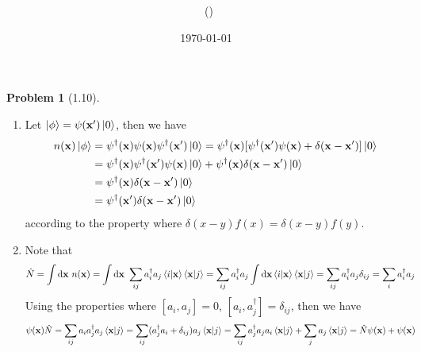 \documentclass[twoside,11pt]{article}
\title{{\lms \Code \ \Ass}}
\author{\lms \name \ (\href{mailto:\mail}{\mail})}
\date{\sffamily \today}
\makeatletter
\renewcommand*\d{\mathop{}\!\mathrm{d}}
\theoremstyle{definition}
\newtheorem{problem}{Problem}
\theoremstyle{remark}
\newtheorem*{remark}{Remark}
\renewcommand{\maketitle}{\bgroup\setlength{\parindent}{0pt}
\begin{flushleft}
  \textbf{\Large\@title}

  \@author
\end{flushleft}\egroup
}
\makeatother
\begin{document}
\maketitle
\thispagestyle{title}


\begin{problem}[1.10]\
\begin{enumerate}[label=(\alph*)]
\item Let $\ket{\phi}=\psi(\mathbf{x}')\ket{0}$, then we have
\begin{align*}
    n(\mathbf{x})\ket{\phi} &= 
    \psi^\dagger(\mathbf{x})\psi(\mathbf{x})
    \psi^\dagger(\mathbf{x}')\ket{0}
    = \psi^\dagger(\mathbf{x})[
        \psi^\dagger(\mathbf{x}')\psi(\mathbf{x})
        + \delta(\mathbf{x}-\mathbf{x}')
    ]\ket{0}\\
    &= \psi^\dagger(\mathbf{x})\psi^\dagger(\mathbf{x}')\psi(\mathbf{x})\ket{0}
    + \psi^\dagger(\mathbf{x})\delta(\mathbf{x}-\mathbf{x}')\ket{0}\\
    &= \psi^\dagger(\mathbf{x})\delta(\mathbf{x}-\mathbf{x}')\ket{0}\\
    &= \psi^\dagger(\mathbf{x}')\delta(\mathbf{x}-\mathbf{x}')\ket{0}
\end{align*}
according to the property where $\delta(x-y)f(x) = \delta(x-y)f(y)$.

\item Note that
\begin{align*}
    \hat{N} &= 
    \int\d\mathbf{x}\ n(\mathbf{x})
    = \int\d\mathbf{x}\ \sum_{ij} a_i^\dagger a_j\braket{i|\mathbf{x}}\braket{\mathbf{x}|j}
    = \sum_{ij} a_i^\dagger a_j\int\d\mathbf{x}\braket{i|\mathbf{x}}\braket{\mathbf{x}|j}
    = \sum_{ij} a_i^\dagger a_j\delta_{ij}
    = \sum_i a_i^\dagger a_j
\end{align*}
Using the properties where $[a_i, a_j]=0$, $[a_i, a_j^\dagger]=\delta_{ij}$,
then we have
\begin{align*}
    \psi(\mathbf{x})\hat{N} &= 
    \sum_{ij}a_ia_j^\dagger a_j\braket{\mathbf{x}|j}
    = \sum_{ij}(a_j^\dagger a_i + \delta_{ij})a_j\braket{\mathbf{x}|j}
    = \sum_{ij}a_j^\dagger a_ja_i\braket{\mathbf{x}|j}
    + \sum_{j} a_j\braket{\mathbf{x}|j}
    = \hat{N}\psi(\mathbf{x}) + \psi(\mathbf{x})
\end{align*}

\end{enumerate}
\end{problem}
\end{document}
